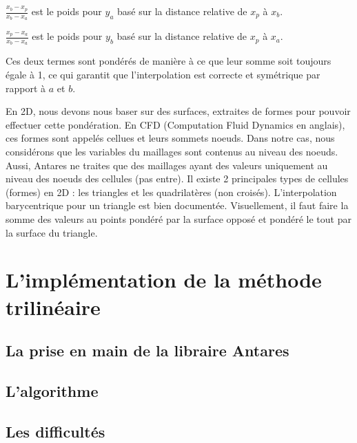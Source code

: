        \( \frac{x_b - x_p}{x_b - x_a} \) est le poids pour \( y_a \) basé sur la distance relative de \( x_p \) à \( x_b \).

        \( \frac{x_p - x_a}{x_b - x_a} \) est le poids pour \( y_b \) basé sur la distance relative de \( x_p \) à \( x_a \).%

Ces deux termes sont pondérés de manière à ce que leur somme soit toujours égale à 1, ce qui garantit que l'interpolation est correcte et symétrique par rapport à \( a \) et \( b \).

En 2D, nous devons nous baser sur des surfaces, extraites de formes pour pouvoir effectuer cette pondération. En CFD (Computation Fluid Dynamics en anglais), ces formes sont appelés cellues et leurs sommets noeuds. Dans notre cas, nous considérons que les variables du maillages sont contenus au niveau des noeuds. Aussi, Antares ne traites que des maillages ayant des valeurs uniquement au niveau des noeuds des cellules (pas entre).
Il existe 2 principales types de cellules (formes) en 2D : les triangles et les quadrilatères (non croisés).
L'interpolation barycentrique pour un triangle est bien documentée. Visuellement, il faut faire la somme des valeurs au points pondéré par la surface opposé et pondéré le tout par la surface du triangle. %






\section{L'implémentation de la méthode trilinéaire}
\subsection{La prise en main de la libraire Antares}
\subsection{L'algorithme}
\subsection{Les difficultés}
